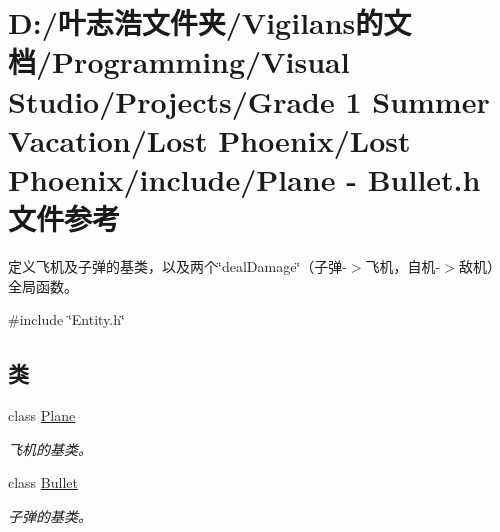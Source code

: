 \hypertarget{_plane_01-_01_bullet_8h}{}\section{D\+:/叶志浩文件夹/\+Vigilans的文档/\+Programming/\+Visual Studio/\+Projects/\+Grade 1 Summer Vacation/\+Lost Phoenix/\+Lost Phoenix/include/\+Plane -\/ Bullet.\+h 文件参考}
\label{_plane_01-_01_bullet_8h}


定义飞机及子弹的基类，以及两个\char`\"{}deal\+Damage\char`\"{}（子弹-\/$>$飞机，自机-\/$>$敌机）全局函数。  


{\ttfamily \#include \char`\"{}Entity.\+h\char`\"{}}\newline
\subsection*{类}
\begin{DoxyCompactItemize}
\item 
class \hyperlink{class_plane}{Plane}
\begin{DoxyCompactList}\small\item\em 飞机的基类。 \end{DoxyCompactList}\item 
class \hyperlink{class_bullet}{Bullet}
\begin{DoxyCompactList}\small\item\em 子弹的基类。 \end{DoxyCompactList}\end{DoxyCompactItemize}

